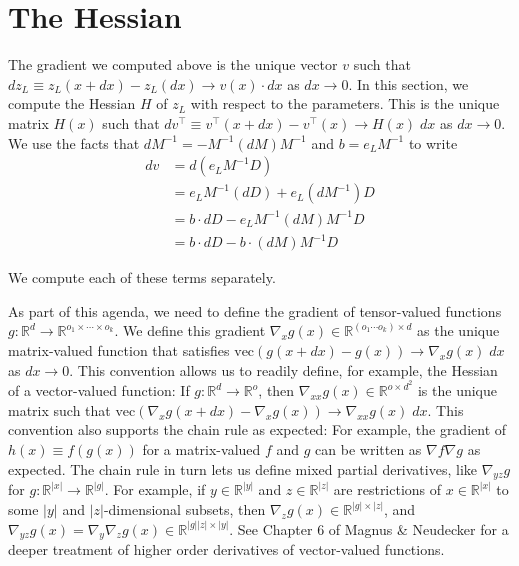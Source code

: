 \documentclass{article}
\begin{document}
\section{The Hessian}

The gradient we computed above is the unique vector $v$ such that $d z_L \equiv
    z_L(x+dx) - z_L(dx) \to v(x) \cdot dx$ as $dx\to 0$. In this section, we
compute the Hessian $H$ of $z_L$ with respect to the parameters. This is the
unique matrix $H(x)$ such that $dv^\top \equiv v^\top(x+dx) - v^\top(x) \to
    H(x)\; dx$ as $dx \to 0$. We use the facts that $dM^{-1} = -M^{-1} (dM) M^{-1}$
and $b=e_L M^{-1}$ to write
\begin{align}
    dv & = d(e_L M^{-1} D) \nonumber                             \\
       & = e_L M^{-1} (dD)+ e_L \left(dM^{-1}\right) D \nonumber \\
       & = b \cdot dD  - e_L M^{-1} (dM) M^{-1} D \nonumber      \\
       & = b \cdot dD  - b \cdot (dM) M^{-1} D
\end{align}

We compute each of these terms separately.

As part of this agenda, we need to define the gradient of tensor-valued
functions $g:\mathbb{R}^d \to \mathbb{R}^{o_1 \times \cdots \times o_k}$. We
define this gradient $\nabla_x g(x)\in \mathbb{R}^{(o_1 \cdots o_k) \times d}$
as the unique matrix-valued function that satisfies $\mathrm{vec} \left(g(x+dx)
    - g(x)\right) \to \nabla_x g(x) \; dx$ as $dx \to 0$. This convention allows us
to readily define, for example, the Hessian of a vector-valued function: If
$g:\mathbb{R}^d \to \mathbb{R}^o$, then $\nabla_{xx} g(x) \in
    \mathbb{R}^{o\times d^2}$ is the unique matrix such that $\mathrm{vec}
    \left(\nabla_x g(x+dx) - \nabla_x g(x)\right) \to \nabla_{xx} g(x) \; dx$. This
convention also supports the chain rule as expected: For example, the gradient
of $h(x) \equiv f(g(x))$ for a matrix-valued $f$ and $g$ can be written as
$\nabla f \nabla g$ as expected. The chain rule in turn lets us define mixed
partial derivatives, like $\nabla_{yz} g$ for $g:\mathbb{R}^{|x|} \to
    \mathbb{R}^{|g|}$. For example, if $y\in \mathbb{R}^{|y|}$ and $z\in
    \mathbb{R}^{|z|}$ are restrictions of $x \in \mathbb{R}^{|x|}$ to some $|y|$
and $|z|$-dimensional subsets, then $\nabla_z g(x) \in \mathbb{R}^{|g| \times
        |z|}$, and $\nabla_{yz} g(x) = \nabla_y \nabla_z g(x) \in \mathbb{R}^{|g||z|
        \times |y|}$. See Chapter 6 of Magnus \& Neudecker for a deeper treatment of
higher order derivatives of vector-valued functions.
\end{document}
